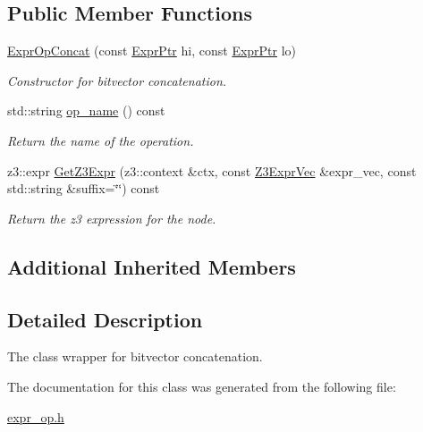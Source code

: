 \subsection*{Public Member Functions}
\begin{DoxyCompactItemize}
\item 
\mbox{\label{classilang_1_1_expr_op_concat_a8ef3638ac5325378267d288fec101cc4}} 
\mbox{\hyperlink{classilang_1_1_expr_op_concat_a8ef3638ac5325378267d288fec101cc4}{Expr\+Op\+Concat}} (const \mbox{\hyperlink{classilang_1_1_expr_a85952b6a34620c4c8cab6bac9c9fdf8c}{Expr\+Ptr}} hi, const \mbox{\hyperlink{classilang_1_1_expr_a85952b6a34620c4c8cab6bac9c9fdf8c}{Expr\+Ptr}} lo)
\begin{DoxyCompactList}\small\item\em Constructor for bitvector concatenation. \end{DoxyCompactList}\item 
\mbox{\label{classilang_1_1_expr_op_concat_a95635579ce4efd00ed3ca70fc4051461}} 
std\+::string \mbox{\hyperlink{classilang_1_1_expr_op_concat_a95635579ce4efd00ed3ca70fc4051461}{op\+\_\+name}} () const
\begin{DoxyCompactList}\small\item\em Return the name of the operation. \end{DoxyCompactList}\item 
\mbox{\label{classilang_1_1_expr_op_concat_a0979d3d3bd24ef576404d7eb7fe8db0b}} 
z3\+::expr \mbox{\hyperlink{classilang_1_1_expr_op_concat_a0979d3d3bd24ef576404d7eb7fe8db0b}{Get\+Z3\+Expr}} (z3\+::context \&ctx, const \mbox{\hyperlink{namespaceilang_adc4eee919aa24fff882d03a48d733c19}{Z3\+Expr\+Vec}} \&expr\+\_\+vec, const std\+::string \&suffix=\char`\"{}\char`\"{}) const
\begin{DoxyCompactList}\small\item\em Return the z3 expression for the node. \end{DoxyCompactList}\end{DoxyCompactItemize}
\subsection*{Additional Inherited Members}


\subsection{Detailed Description}
The class wrapper for bitvector concatenation. 

The documentation for this class was generated from the following file\+:\begin{DoxyCompactItemize}
\item 
\mbox{\hyperlink{expr__op_8h}{expr\+\_\+op.\+h}}\end{DoxyCompactItemize}
